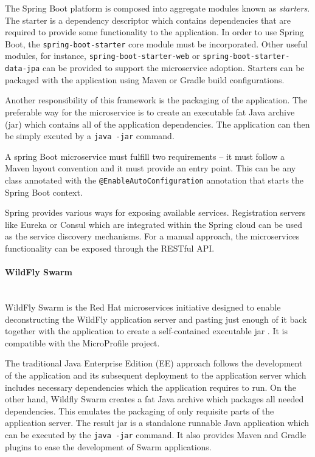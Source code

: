 \documentclass[oneside,
  digital, %
  table,   %
  lof,     %
  lot,     %
]{fithesis3}
\newcommand{\newlinepar}[1]{\paragraph{#1}\needspace{4\baselineskip}\mbox{}\\}
\begin{document}
The Spring Boot platform is composed into aggregate modules known as \textit{starters}. The starter is a dependency descriptor which contains dependencies that are required to provide some functionality to the application. In order to use Spring Boot, the \texttt{spring-boot-starter} core module must be incorporated. Other useful modules, for instance, \texttt{spring-boot-starter-web} or \texttt{spring-boot-starter-data-jpa} can be provided to support the microservice adoption. Starters can be packaged with the application using Maven or Gradle build configurations.

Another responsibility of this framework is the packaging of the application. The preferable way for the microservice is to create an executable fat Java archive (jar) which contains all of the application dependencies. The application can then be simply excuted by a \texttt{java -jar} command.

A spring Boot microservice must fulfill two requirements -- it must follow a Maven layout convention and it must provide an entry point. This can be any class annotated with the \texttt{@EnableAutoConfiguration} annotation that starts the Spring Boot context.

Spring provides various ways for exposing available services. Registration servers like Eureka or Consul which are integrated within the Spring cloud \cite{spring_cloud} can be used as the service discovery mechanisms. For a manual approach, the microservices functionality can be exposed through the RESTful API.

\newlinepar{WildFly Swarm}

WildFly Swarm is the Red Hat microservices initiative designed to enable deconstructing the WildFly application server and pasting just enough of it back together with the application to create a self-contained executable jar \cite{gupta_2018}. It is compatible with the MicroProfile project.

The traditional Java Enterprise Edition (EE) approach follows the development of the application and its subsequent deployment to the application server which includes necessary dependencies which the application requires to run. On the other hand, Wildfly Swarm creates a fat Java archive which packages all needed dependencies. This emulates the packaging of only requisite parts of the application server. The result jar is a standalone runnable Java application which can be executed by the \texttt{java -jar} command. It also provides Maven and Gradle plugins to ease the development of Swarm applications.
\end{document}
